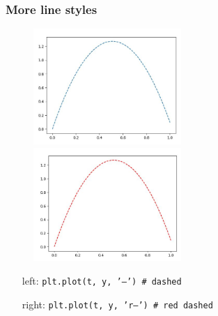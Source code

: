 \documentclass[14pt]{beamer}
\begin{document}
\begin{frame}[fragile]
\frametitle{More line styles}

\begin{figure}[ht]
	\centering
	\includegraphics[width=0.5\textwidth]{figures/LLp23coutput}%
	\includegraphics[width=0.5\textwidth]{figures/LLp23doutput}
\end{figure}
\vspace*{-8mm}
\begin{itemize}
\item[left:] \texttt{plt.plot(t, y, '--') \# dashed}
\item[right:] \texttt{plt.plot(t, y, 'r--') \# red dashed}
\end{itemize}

\end{frame}

\end{document}
